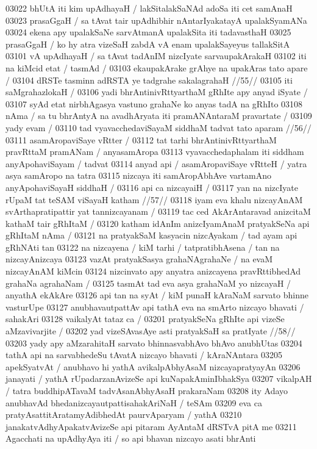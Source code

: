 03022 bhUtA iti kim upAdhayaH / lakSitalakSaNAd adoSa iti cet samAnaH  
03023 prasaGgaH / sa tAvat tair upAdhibhir nAntarIyakatayA  upalakSyamANa 
03024 ekena apy upalakSaNe sarvAtmanA upalakSita iti tadavasthaH 
03025 prasaGgaH / ko hy atra vizeSaH zabdA vA enam upalakSayeyus tallakSitA 
03101 vA upAdhayaH / sa tAvat tadAnIM nizcIyate sarvaupakArakaH
03102 iti na kiMcid etat / tasmAd /  
03103 	ekaupakArake grAhye na upakAras tato apare /
03104 	dRSTe tasminn adRSTA ye tadgrahe sakalagrahaH //55//  
03105 iti saMgrahazlokaH /
03106 	yadi bhrAntinivRttyarthaM gRhIte apy anyad iSyate /  
03107 syAd etat nirbhAgasya vastuno grahaNe ko anyas tadA na gRhIto
03108 nAma / sa tu bhrAntyA na avadhAryata iti pramANAntaraM pravartate /
03109 yady evam /
03110 	tad vyavacchedaviSayaM siddhaM tadvat tato aparam //56//
03111 	asamAropaviSaye vRtter /
03112 tat tarhi bhrAntinivRttyarthaM pravRttaM pramANam / anyasamAropa
03113 vyavacchedaphalam iti siddham anyApohaviSayam / tadvat  
03114 anyad api / asamAropaviSaye vRtteH / yatra asya samAropo na tatra
03115 nizcaya iti samAropAbhAve vartamAno anyApohaviSayaH siddhaH /
03116 	api ca nizcayaiH /
03117 	yan na nizcIyate rUpaM tat teSAM viSayaH katham //57//
03118 iyam eva khalu nizcayAnAM svArthapratipattir yat tannizcayanam /  
03119 tac ced AkArAntaravad anizcitaM kathaM tair gRhItaM /
03120 katham idAnIm anizcIyamAnaM pratyakSeNa api gRhItaM nAma / 
03121 na pratyakSaM kasyacin nizcAyakam / tad ayam api gRhNAti tan
03122 na nizcayena / kiM tarhi / tatpratibhAsena / tan na nizcayAnizcaya
03123 vazAt pratyakSasya grahaNAgrahaNe / na evaM nizcayAnAM kiMcin  
03124 nizcinvato apy anyatra anizcayena pravRttibhedAd grahaNa agrahaNam /
03125 tasmAt tad eva asya grahaNaM yo nizcayaH / anyathA ekAkAre 
03126 api tan na syAt / kiM punaH kAraNaM sarvato bhinne vasturUpe 
03127 anubhavautpattAv api tathA eva na smArto nizcayo bhavati /  sahakAri
03128 vaikalyAt tataz ca /  
03201 	pratyakSeNa gRhIte api vizeSe aMzavivarjite / 
03202 	yad vizeSAvasAye asti pratyakSaH sa pratIyate //58// 
03203 yady apy aMzarahitaH sarvato bhinnasvabhAvo bhAvo anubhUtas 
03204 tathA api na sarvabhedeSu tAvatA nizcayo bhavati / kAraNAntara 
03205 apekSyatvAt / anubhavo hi yathA avikalpAbhyAsaM nizcayapratyayAn
03206 janayati / yathA rUpadarzanAvizeSe api kuNapakAminIbhakSya
03207 vikalpAH / tatra buddhipATavaM tadvAsanAbhyAsaH prakaraNam 
03208 ity Adayo anubhavAd bhedanizcayautpattisahakAriNaH / teSAm
03209 eva ca pratyAsattitAratamyAdibhedAt paurvAparyam / yathA  
03210 janakatvAdhyApakatvAvizeSe api pitaram AyAntaM dRSTvA pitA me 
03211 Agacchati na upAdhyAya iti / so api bhavan nizcayo asati bhrAnti  
